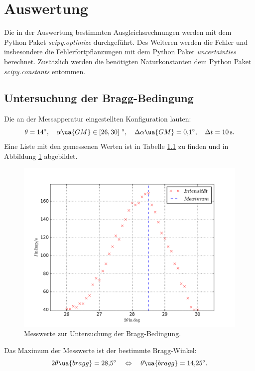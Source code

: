 \section{Auswertung}
Die in der Auswertung bestimmten Ausgleichsrechnungen werden mit
dem Python Paket \emph{scipy.optimize}\cite{scipy} durchgeführt.
Des Weiteren werden die Fehler und insbesondere die Fehlerfortpflanzungen
mit dem Python Paket \emph{uncertainties}\cite{uncertainties} berechnet.
Zusätzlich werden die benötigten Naturkonstanten dem Python Paket \emph{scipy.constants}\cite{scipy.constants}
entommen.

\subsection{Untersuchung der Bragg-Bedingung}
Die an der Messapperatur eingestellten Konfiguration lauten:
\begin{equation*}
  \theta=\SI{14}{\degree}, \quad \alpha\ua{GM}\in\left[26,30\right]\,\si{\degree},\quad \Delta\alpha\ua{GM}=\SI{0.1}{\degree}, \quad \Delta t=\SI{10}{\second}.
\end{equation*}
Eine Liste mit den gemessenen Werten ist in Tabelle \ref{} zu finden und in Abbildung \ref{fig: bragg_plot} abgebildet.

\begin{figure}
  \centering
  \includegraphics[width=0.8 \textwidth]{../Messdaten/bragbed.pdf}
  \caption{Messwerte zur Untersuchung der Bragg-Bedingung.} %
  \label{fig: bragg_plot}
\end{figure}
Das Maximum der Messwerte ist der bestimmte Bragg-Winkel:
\begin{equation}
  \label{eq:bestimmt_bragg_winkel}
  2\theta\ua{bragg}=\SI{28.5}{\degree} \quad \Leftrightarrow \quad \theta\ua{bragg}=\SI{14.25}{\degree}.
\end{equation}

